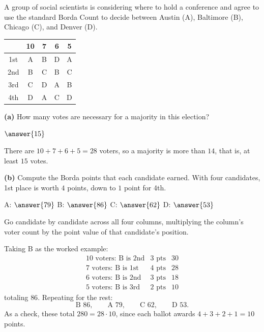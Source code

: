 \documentclass[12pt]{ximera}
\begin{document}
\begin{problem}
A group of social scientists is considering where to hold a conference and agree to use
the standard Borda Count to decide between Austin (A), Baltimore (B), Chicago (C), and
Denver (D).

\begin{center}
\begin{tabular}{c|cccc}
 & 10 & 7 & 6 & 5 \\\hline
1st & A & B & D & A \\
2nd & B & C & B & C \\
3rd & C & D & A & B \\
4th & D & A & C & D \\
\end{tabular}
\end{center}

\begin{prompt}
\textbf{(a)} How many votes are necessary for a majority in this election?

$\answer{15}$

\begin{feedback}
There are $10+7+6+5 = 28$ voters, so a majority is more than $14$, that is, at least
$15$ votes.
\end{feedback}
\end{prompt}

\begin{prompt}
\textbf{(b)} Compute the Borda points that each candidate earned. With four
candidates, 1st place is worth $4$ points, down to $1$ point for 4th.

A: $\answer{79}$ \quad B: $\answer{86}$ \quad C: $\answer{62}$ \quad D: $\answer{53}$

\begin{hint}
Go candidate by candidate across all four columns, multiplying the column's voter count
by the point value of that candidate's position.
\end{hint}

\begin{feedback}
Taking B as the worked example:
\[
\begin{array}{lll}
\text{10 voters: B is 2nd} & 3\text{ pts} & 30\\
\text{7 voters: B is 1st}  & 4\text{ pts} & 28\\
\text{6 voters: B is 2nd}  & 3\text{ pts} & 18\\
\text{5 voters: B is 3rd}  & 2\text{ pts} & 10
\end{array}
\]
totaling $86$. Repeating for the rest:
\[ \text{B } 86, \qquad \text{A } 79, \qquad \text{C } 62, \qquad \text{D } 53. \]
As a check, these total $280 = 28\cdot 10$, since each ballot awards
$4+3+2+1=10$ points. \checkmark
\end{feedback}
\end{prompt}


\end{problem}
\end{document}
